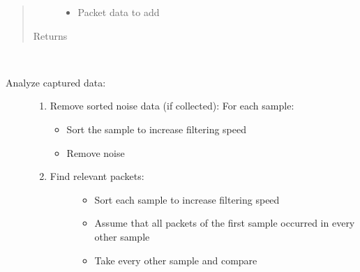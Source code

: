\documentclass[letterpaper,10pt,english]{sphinxmanual}
\begin{document}
\begin{fulllineitems}
\begin{fulllineitems}
\begin{quote}
\begin{description}
\begin{itemize}
\item {} 
 \textendash{} Packet data to add

\end{itemize}

\item[{Returns}] \leavevmode


\end{description}\end{quote}

\end{fulllineitems}


\begin{fulllineitems}
\label{\detokenize{src:src.FilterTab.FilterTab.analyze}}~\begin{description}
\item[{Analyze captured data:}] \leavevmode\begin{enumerate}
\item {} 
Remove sorted noise data (if collected):
For each sample:
\begin{itemize}
\item {} 
Sort the sample to increase filtering speed

\item {} 
Remove noise

\end{itemize}

\item {} \begin{description}
\item[{Find relevant packets:}] \leavevmode\begin{itemize}
\item {} 
Sort each sample to increase filtering speed

\item {} 
Assume that all packets of the first sample occurred in every other sample

\item {} 
Take every other sample and compare

\end{itemize}

\end{description}

\end{enumerate}

\end{description}


\end{fulllineitems}
\end{fulllineitems}
\end{document}
